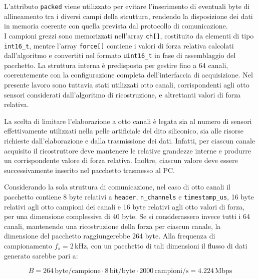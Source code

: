 \documentclass[10pt, a4paper]{article}
\begin{document}
                L'attributo \texttt{packed} viene utilizzato per evitare l'inserimento di eventuali byte di allineamento tra i diversi campi della struttura, 
                rendendo la disposizione dei dati in memoria coerente con quella prevista dal protocollo di comunicazione.\\

                I campioni grezzi sono memorizzati nell'array \texttt{ch[]}, costituito da elementi di tipo \texttt{int16\_t}, mentre l'array \texttt{force[]} 
                contiene i valori di forza relativa calcolati dall'algoritmo e convertiti nel formato \texttt{uint16\_t} in fase di assemblaggio del pacchetto.
                La struttura interna è predisposta
                per gestire fino a 64 canali, coerentemente con la configurazione completa dell'interfaccia di acquisizione. Nel presente lavoro sono 
                tuttavia stati utilizzati otto canali, corrispondenti agli otto sensori considerati dall'algoritmo di ricostruzione, e altrettanti valori
                di forza relativa.

                La scelta di limitare l'elaborazione a otto canali è legata sia al numero di sensori effettivamente utilizzati nella pelle artificiale del 
                dito siliconico, sia alle risorse richieste dall'elaborazione e dalla trasmissione dei dati. Infatti, per ciascun canale acquisito il 
                ricostruttore deve mantenere le relative grandezze interne e produrre un corrispondente valore di forza relativa. Inoltre, ciascun valore 
                deve essere successivamente inserito nel pacchetto trasmesso al PC.

                Considerando la sola struttura di comunicazione, nel caso di otto canali il pacchetto contiene 8 byte relativi a \texttt{header}, 
                \texttt{n\_channels} e \texttt{timestamp\_us}, 16 byte relativi agli otto campioni dei canali e 16 byte relativi agli otto valori di forza,
                per una dimensione complessiva di 40 byte. Se si considerassero invece tutti i 64 canali, mantenendo una ricostruzione della forza per ciascun 
                canale, la dimensione del pacchetto raggiungerebbe 264 byte. Alla frequenza di campionamento $f_s = 2\,\mathrm{kHz}$, con un pacchetto di tali dimensioni
                il flusso di dati generato sarebbe pari a:
                
                    \begin{equation}
                    B = 264\,\mathrm{byte/campione} \cdot 8\,\mathrm{bit/byte} \cdot 2000\,\mathrm{campioni/s} = 4.224\,\mathrm{Mbps}
                    \end{equation}
\end{document}
